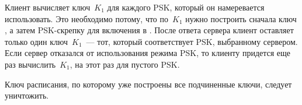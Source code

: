 Клиент вычисляет ключ~$K_1$ для каждого PSK, который он намеревается 
использовать. Это необходимо потому, что по~$K_1$ нужно построить сначала ключ 
, а затем PSK-скрепку для включения в 
. После ответа сервера клиент оставляет только один  
ключ~$K_1$~--- тот, который соответствует PSK, выбранному сервером. Если сервер 
отказался от использования режима PSK, то клиенту придется еще раз 
вычислить~$K_1$, на этот раз для пустого PSK.

Ключ расписания, по которому уже построены все подчиненные ключи, следует 
уничтожить.



